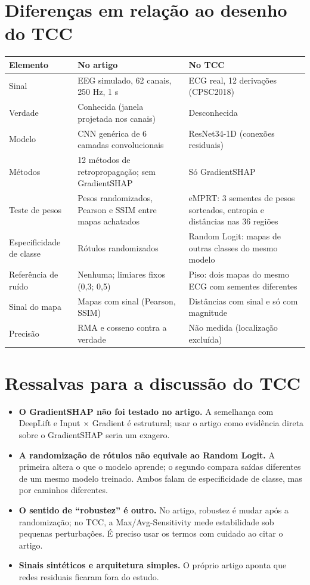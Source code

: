 \documentclass[11pt,a4paper]{article}
\begin{document}
\section{Diferenças em relação ao desenho do TCC}
\begin{center}\small
\begin{tabularx}{\linewidth}{lXX}
\toprule
\textbf{Elemento} & \textbf{No artigo} & \textbf{No TCC} \\
\midrule
Sinal & EEG simulado, 62 canais, 250 Hz, 1 s & ECG real, 12 derivações (CPSC2018) \\ \addlinespace
Verdade & Conhecida (janela projetada nos canais) & Desconhecida \\ \addlinespace
Modelo & CNN genérica de 6 camadas convolucionais & ResNet34-1D (conexões residuais) \\ \addlinespace
Métodos & 12 métodos de retropropagação; sem GradientSHAP & Só GradientSHAP \\ \addlinespace
Teste de pesos & Pesos randomizados, Pearson e SSIM entre mapas achatados & eMPRT: 3 sementes de pesos sorteados, entropia e distâncias nas 36 regiões \\ \addlinespace
Especificidade de classe & Rótulos randomizados & Random Logit: mapas de outras classes do mesmo modelo \\ \addlinespace
Referência de ruído & Nenhuma; limiares fixos (0,3; 0,5) & Piso: dois mapas do mesmo ECG com sementes diferentes \\ \addlinespace
Sinal do mapa & Mapas com sinal (Pearson, SSIM) & Distâncias com sinal e só com magnitude \\ \addlinespace
Precisão & RMA e cosseno contra a verdade & Não medida (localização excluída) \\
\bottomrule
\end{tabularx}
\end{center}

\section{Ressalvas para a discussão do TCC}
\begin{itemize}
\item \textbf{O GradientSHAP não foi testado no artigo.} A semelhança com DeepLift e Input $\times$ Gradient é estrutural; usar o artigo como evidência direta sobre o GradientSHAP seria um exagero.
\item \textbf{A randomização de rótulos não equivale ao Random Logit.} A primeira altera o que o modelo aprende; o segundo compara saídas diferentes de um mesmo modelo treinado. Ambos falam de especificidade de classe, mas por caminhos diferentes.
\item \textbf{O sentido de “robustez” é outro.} No artigo, robustez é mudar após a randomização; no TCC, a Max/Avg-Sensitivity mede estabilidade sob pequenas perturbações. É preciso usar os termos com cuidado ao citar o artigo.
\item \textbf{Sinais sintéticos e arquitetura simples.} O próprio artigo aponta que redes residuais ficaram fora do estudo.
\end{itemize}
\end{document}
